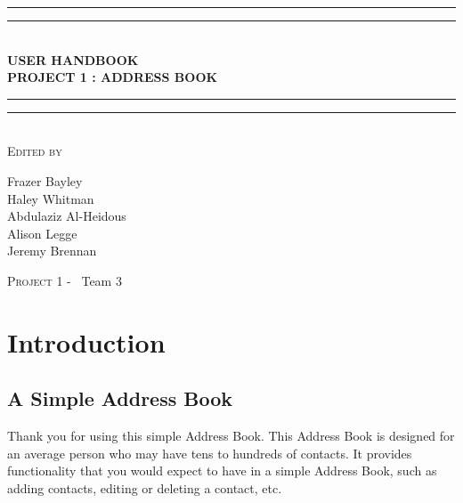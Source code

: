 \documentclass[a4paper, 11pt]{article}
\newlength{\drop}
\begin{document}
  
  
  \begin{titlepage}
    \textheight
    \centering
    \vspace*{\baselineskip}
    \rule{\textwidth}{1.6pt}\vspace*{-\baselineskip}\vspace*{2pt}
    \rule{\textwidth}{0.4pt}\\[\baselineskip]
    {\LARGE \textbf{USER HANDBOOK \\ PROJECT 1 : ADDRESS BOOK}}\\[0.2\baselineskip]
    \rule{\textwidth}{0.4pt}\vspace*{-\baselineskip}\vspace{3.2pt}
    \rule{\textwidth}{1.6pt}\\[\baselineskip]
    \scshape
    \vspace*{2\baselineskip}
    Edited by \\[\baselineskip]
    {\Large Frazer Bayley \\ Haley Whitman \\ Abdulaziz Al-Heidous \\ Alison Legge \\ Jeremy Brennan\par}

    \vfill
    {\scshape \LARGE Project 1 -} \        {\LARGE Team 3}\par
  \end{titlepage}


\tableofcontents
\vspace*{25\baselineskip}
\begin{versionhistory}
\end{versionhistory}
\pagebreak


\section{Introduction}
\subsection{A Simple Address Book}
Thank you for using this simple Address Book. This Address Book is designed for an average person who may have tens to hundreds of contacts. It provides functionality that you would expect to have in a simple Address Book, such as adding contacts, editing or deleting a contact, etc. 
\end{document}
